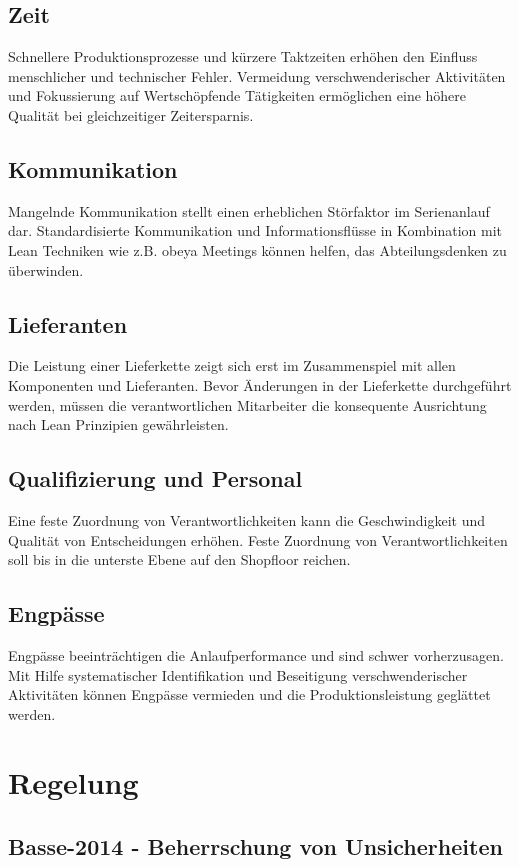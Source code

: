 \subsection*{Zeit}
Schnellere Produktionsprozesse und kürzere Taktzeiten erhöhen den Einfluss menschlicher und technischer Fehler. 
%
Vermeidung verschwenderischer Aktivitäten und Fokussierung auf Wertschöpfende Tätigkeiten ermöglichen eine höhere Qualität bei gleichzeitiger Zeitersparnis. 

\subsection*{Kommunikation}
Mangelnde Kommunikation stellt einen erheblichen Störfaktor im Serienanlauf dar. 
%
Standardisierte Kommunikation und Informationsflüsse in Kombination mit Lean Techniken wie z.B. \gls{obeya} Meetings können helfen, das Abteilungsdenken zu überwinden. 

\subsection*{Lieferanten}
Die Leistung einer Lieferkette zeigt sich erst im Zusammenspiel mit allen Komponenten und Lieferanten. 
Bevor Änderungen in der Lieferkette durchgeführt werden, müssen die verantwortlichen Mitarbeiter die konsequente Ausrichtung nach Lean Prinzipien gewährleisten. 

\subsection*{Qualifizierung und Personal}
Eine feste Zuordnung von Verantwortlichkeiten kann die Geschwindigkeit und Qualität von Entscheidungen erhöhen. 
Feste Zuordnung von Verantwortlichkeiten soll bis in die unterste Ebene auf den Shopfloor reichen.


\subsection*{Engpässe}
Engpässe beeinträchtigen die Anlaufperformance und sind schwer vorherzusagen. 
%
Mit Hilfe systematischer Identifikation und Beseitigung verschwenderischer Aktivitäten können Engpässe vermieden und die Produktionsleistung geglättet werden. 

\section{Regelung}
\subsection*{Basse-2014 - Beherrschung von Unsicherheiten}

